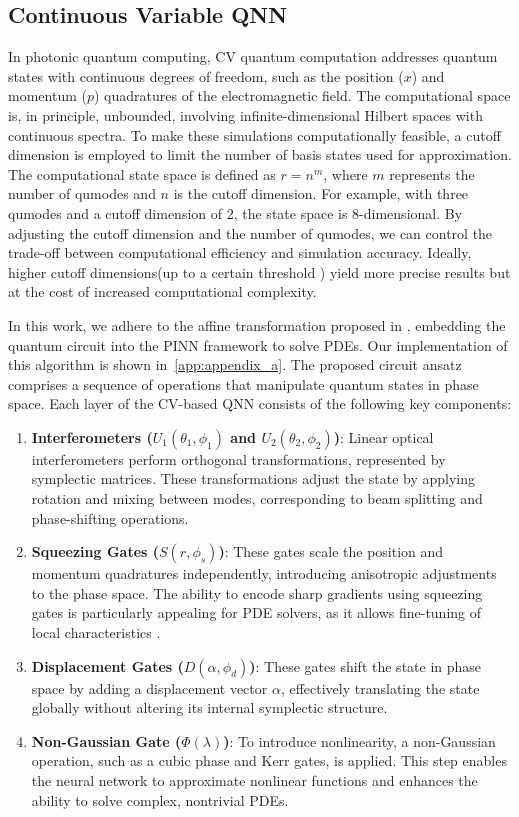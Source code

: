 \subsection{Continuous Variable QNN}

In photonic quantum computing, CV quantum computation addresses quantum states with continuous degrees of freedom, such as the position ($x$) and momentum ($p$) quadratures of the electromagnetic field. The computational space is, in principle, unbounded, involving infinite-dimensional Hilbert spaces with continuous spectra.
To make these simulations computationally feasible, a cutoff dimension is employed to limit the number of basis states used for approximation. The computational state space is defined as $r = n^m$, where $m$ represents the number of qumodes and $n$ is the cutoff dimension. For example, with three qumodes and a cutoff dimension of 2, the state space is 8-dimensional. By adjusting the cutoff dimension and the number of qumodes, we can control the trade-off between computational efficiency and simulation accuracy. Ideally, higher cutoff dimensions(up to a certain threshold ) yield more precise results but at the cost of increased computational complexity.

In this work, we adhere to the affine transformation proposed in \cite{killoran2019continuous}, embedding the quantum circuit into the PINN framework to solve PDEs. Our implementation of this algorithm is shown in~\ref{app:appendix_a}. The proposed circuit ansatz comprises a sequence of operations that manipulate quantum states in phase space.  Each layer of the CV-based QNN consists of the following key components:


\begin{enumerate}
    \item \textbf{Interferometers (\(U_1(\theta_1, \phi_1)\) and \(U_2(\theta_2, \phi_2)\))}: Linear optical interferometers perform orthogonal transformations, represented by symplectic matrices. These transformations adjust the state by applying rotation and mixing between modes, corresponding to beam splitting and phase-shifting operations. 
    \item \textbf{Squeezing Gates (\(S(r, \phi_s)\))}: These gates scale the position and momentum quadratures independently, introducing anisotropic adjustments to the phase space. The ability to encode sharp gradients using squeezing gates is particularly appealing for PDE solvers, as it allows fine-tuning of local characteristics \cite{sedykh2024hybrid}.
    \item \textbf{Displacement Gates (\(D(\alpha, \phi_d)\))}: These gates shift the state in phase space by adding a displacement vector \(\alpha\), effectively translating the state globally without altering its internal symplectic structure.  
    \item \textbf{Non-Gaussian Gate (\(\Phi(\lambda)\))}: To introduce nonlinearity, a non-Gaussian operation, such as a cubic phase and Kerr gates, is applied. This step enables the neural network to approximate nonlinear functions and enhances the ability to solve complex, nontrivial PDEs.
\end{enumerate}

